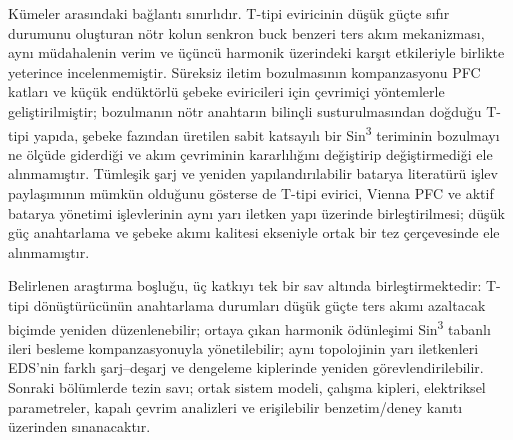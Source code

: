 Kümeler arasındaki bağlantı sınırlıdır. T-tipi eviricinin düşük güçte sıfır durumunu oluşturan nötr kolun senkron buck benzeri ters akım mekanizması, aynı müdahalenin verim ve üçüncü harmonik üzerindeki karşıt etkileriyle birlikte yeterince incelenmemiştir. Süreksiz iletim bozulmasının kompanzasyonu PFC katları ve küçük endüktörlü şebeke eviricileri için çevrimiçi yöntemlerle geliştirilmiştir; bozulmanın nötr anahtarın bilinçli susturulmasından doğduğu T-tipi yapıda, şebeke fazından üretilen sabit katsayılı bir Sin\textsuperscript{3} teriminin bozulmayı ne ölçüde giderdiği ve akım çevriminin kararlılığını değiştirip değiştirmediği ele alınmamıştır. Tümleşik şarj ve yeniden yapılandırılabilir batarya literatürü işlev paylaşımının mümkün olduğunu gösterse de T-tipi evirici, Vienna PFC ve aktif batarya yönetimi işlevlerinin aynı yarı iletken yapı üzerinde birleştirilmesi; düşük güç anahtarlama ve şebeke akımı kalitesi ekseniyle ortak bir tez çerçevesinde ele alınmamıştır.

Belirlenen araştırma boşluğu, üç katkıyı tek bir sav altında birleştirmektedir: T-tipi dönüştürücünün anahtarlama durumları düşük güçte ters akımı azaltacak biçimde yeniden düzenlenebilir; ortaya çıkan harmonik ödünleşimi Sin\textsuperscript{3} tabanlı ileri besleme kompanzasyonuyla yönetilebilir; aynı topolojinin yarı iletkenleri EDS'nin farklı şarj--deşarj ve dengeleme kiplerinde yeniden görevlendirilebilir. Sonraki bölümlerde tezin savı; ortak sistem modeli, çalışma kipleri, elektriksel parametreler, kapalı çevrim analizleri ve erişilebilir benzetim/deney kanıtı üzerinden sınanacaktır.
